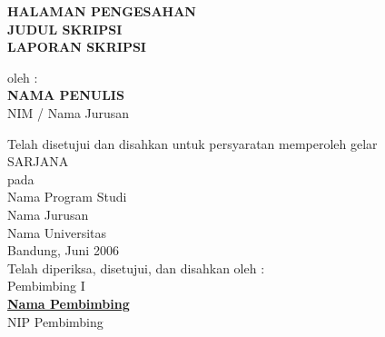 \documentclass[a4paper,12pt]{book}
\begin{document}
\thispagestyle{empty}
\begin{center}{%
\textbf{\large HALAMAN PENGESAHAN\\[1.3cm]
  {\normalsize \textbf{JUDUL SKRIPSI}}}\\[1.5cm]

  \textbf{\large LAPORAN SKRIPSI}
     
      \par
      \vspace{0.8cm}
      {oleh :
      \\
      \large \textbf{NAMA PENULIS}\\
      NIM / Nama Jurusan
     
      }
\vspace{1.5cm}
Telah disetujui dan disahkan untuk persyaratan memperoleh gelar\\[0.2cm]
SARJANA\\[0.2cm]
pada\\[0.2cm]
Nama Program Studi\\[0.2cm]
Nama Jurusan\\[0.2cm]
Nama Universitas\\[2cm]
Bandung, Juni 2006\\[0.2cm] %
Telah diperiksa, disetujui, dan disahkan oleh :\\
Pembimbing I\\[2.3cm]
\textbf{\bfseries \underline{Nama Pembimbing}}\\[0.2cm]
NIP Pembimbing\\

}\end{center}
\pagestyle{fancy}\fancyhead{}
\renewcommand{\chaptermark}[1]{\markboth{#1}{}}
\renewcommand{\sectionmark}[1]{\markright{\thesection\ #1}}
\fancyhf{}
\fancyfoot[R]{\bfseries\thepage}
\fancyhead[R]{\bfseries \rightmark}
\renewcommand{\headrulewidth}{1pt}
\renewcommand{\headrule}{{\color{black}%
\hrule width\headwidth height\headrulewidth \vskip-\headrulewidth}}
\renewcommand{\footrulewidth}{1pt}\addtolength{\headheight}{13.6pt}
\fancypagestyle{plain}{
\fancyhead{}
\renewcommand{\headrulewidth}{0pt}
}
\setcounter{tocdepth}{4}
\end{document}
